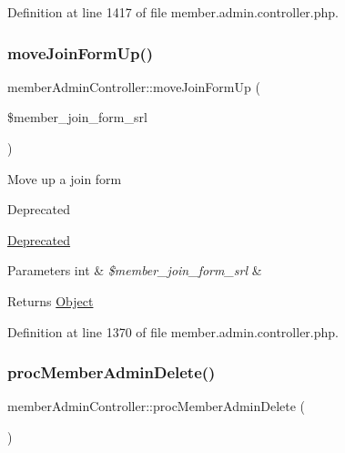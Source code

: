 Definition at line 1417 of file member.\+admin.\+controller.\+php.

\hypertarget{classmemberAdminController_a6ab62c7dab973a7dc4d12b7739d82660}{}\label{classmemberAdminController_a6ab62c7dab973a7dc4d12b7739d82660} 
\subsubsection{\texorpdfstring{move\+Join\+Form\+Up()}{moveJoinFormUp()}}
{\footnotesize\ttfamily member\+Admin\+Controller\+::move\+Join\+Form\+Up (\begin{DoxyParamCaption}\item[{}]{\$member\+\_\+join\+\_\+form\+\_\+srl }\end{DoxyParamCaption})}

Move up a join form \begin{DoxyRefDesc}{Deprecated}
\item[\hyperlink{deprecated__deprecated000023}{Deprecated}]\end{DoxyRefDesc}

\begin{DoxyParams}[1]{Parameters}
int & {\em \$member\+\_\+join\+\_\+form\+\_\+srl} & \\
\hline
\end{DoxyParams}
\begin{DoxyReturn}{Returns}
\hyperlink{classObject}{Object} 
\end{DoxyReturn}


Definition at line 1370 of file member.\+admin.\+controller.\+php.

\hypertarget{classmemberAdminController_abbab5de7009e650ce1ca96d335e9b7be}{}\label{classmemberAdminController_abbab5de7009e650ce1ca96d335e9b7be} 
\subsubsection{\texorpdfstring{proc\+Member\+Admin\+Delete()}{procMemberAdminDelete()}}
{\footnotesize\ttfamily member\+Admin\+Controller\+::proc\+Member\+Admin\+Delete (\begin{DoxyParamCaption}{ }\end{DoxyParamCaption})}

